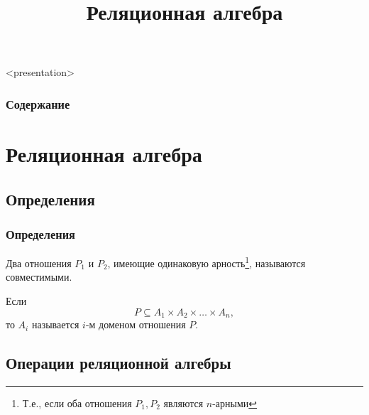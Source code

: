 


\title{Реляционная алгебра}





\begin{frame}<presentation>
    \frametitle{Содержание}
    \tableofcontents
\end{frame}


\section{Реляционная алгебра}


\subsection{Определения}

\begin{frame}
    \frametitle{Определения}
    
    \begin{definition}
        Два отношения $P_1$ и $P_2$, имеющие одинаковую \alert{арность}\footnote{Т.е., если оба отношения $P_1,P_2$ являются $n$-арными}, называются \alert{совместимыми}.
    \end{definition}
    
    \begin{definition}
        Если
        \[P\subseteq A_1\times A_2\times\ldots\times A_n,\]
        то $A_i$ называется $i$-м \alert{доменом} отношения $P$.
    \end{definition}
\end{frame}


\subsection{Операции реляционной алгебры}

